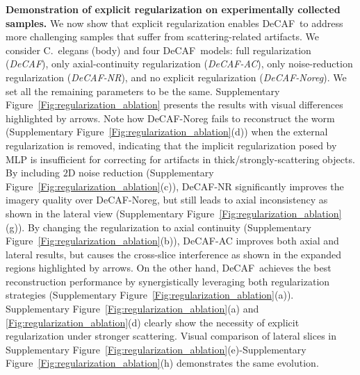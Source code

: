 \documentclass[11pt]{article}
\theoremstyle{plain} %
\def\proposed{DeCAF}
\begin{document}
\vspace{0.5em}
\noindent
\textbf{Demonstration of explicit regularization on experimentally collected samples.}
We now show that explicit regularization enables \proposed~to address more challenging samples that suffer from scattering-related artifacts. We consider C.\ elegans (body) and four \proposed~models: full regularization (\emph{\proposed}), only axial-continuity regularization (\emph{\proposed-AC}), only noise-reduction regularization (\emph{\proposed-NR}), and no explicit regularization (\emph{\proposed-Noreg}).
We set all the remaining parameters to be the same. Supplementary Figure~\ref{Fig:regularization_ablation} presents the results with visual differences highlighted by arrows. Note how \proposed-Noreg fails to reconstruct the worm (Supplementary Figure~\ref{Fig:regularization_ablation}(d)) when the external regularization is removed, indicating that the implicit regularization posed by MLP is insufficient for correcting for artifacts in thick/strongly-scattering objects.
By including $2$D noise reduction (Supplementary Figure~\ref{Fig:regularization_ablation}(c)), \proposed-NR significantly improves the imagery quality over \proposed-Noreg, but still leads to axial inconsistency as shown in the lateral view (Supplementary Figure~\ref{Fig:regularization_ablation}(g)).
By changing the regularization to axial continuity (Supplementary Figure~\ref{Fig:regularization_ablation}(b)), \proposed-AC improves both axial and lateral results, but causes the cross-slice interference as shown in the expanded regions highlighted by arrows.
On the other hand, \proposed~achieves the best reconstruction performance by synergistically leveraging both regularization strategies (Supplementary Figure~\ref{Fig:regularization_ablation}(a)). 
Supplementary Figure~\ref{Fig:regularization_ablation}(a) and \ref{Fig:regularization_ablation}(d) clearly show the necessity of explicit regularization under stronger scattering.
Visual comparison of lateral slices in Supplementary Figure~\ref{Fig:regularization_ablation}(e)-Supplementary Figure~\ref{Fig:regularization_ablation}(h) demonstrates the same evolution.
\end{document}
